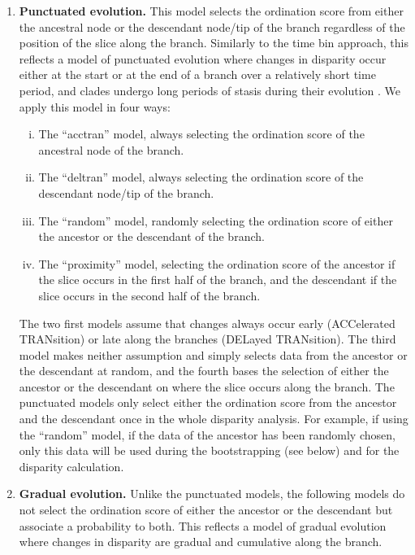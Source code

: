 \documentclass[12pt,a4paper]{article}
\begin{document}
\begin{enumerate}

    \item{\textbf{Punctuated evolution.}} 
    This model selects the ordination score from either the ancestral node or the descendant node/tip of the branch regardless of the position of the slice along the branch. 
    Similarly to the time bin approach, this reflects a model of punctuated evolution where changes in disparity occur either at the start or at the end of a branch over a relatively short time period, and clades undergo long periods of stasis during their evolution \citep{Gould1977,Hunt20112007}.
    We apply this model in four ways: 

    \begin{enumerate}[(i)]

      \item The ``acctran'' model, always selecting the ordination score of the ancestral node of the branch.
      \item The ``deltran'' model, always selecting the ordination score of the descendant node/tip of the branch.
      \item The ``random'' model, randomly selecting the ordination score of either the ancestor or the descendant of the branch.
      \item The ``proximity'' model, selecting the ordination score of the ancestor if the slice occurs in the first half of the branch, and the descendant if the slice occurs in the second half of the branch.

    \end{enumerate}

    The two first models assume that changes always occur early (ACCelerated TRANsition) or late along the branches (DELayed TRANsition).
    The third model makes neither assumption and simply selects data from the ancestor or the descendant at random, and the fourth bases the selection of either the ancestor or the descendant on where the slice occurs along the branch.
    The punctuated models only select either the ordination score from the ancestor and the descendant once in the whole disparity analysis.
    For example, if using the ``random'' model, if the data of the ancestor has been randomly chosen, only this data will be used during the bootstrapping (see below) and for the disparity calculation.
    
    \item{\textbf{Gradual evolution.}}
    Unlike the punctuated models, the following models do not select the ordination score of either the ancestor or the descendant but associate a probability to both.
    This reflects a model of gradual evolution where changes in disparity are gradual and cumulative along the branch.


\end{enumerate}
\end{document}
